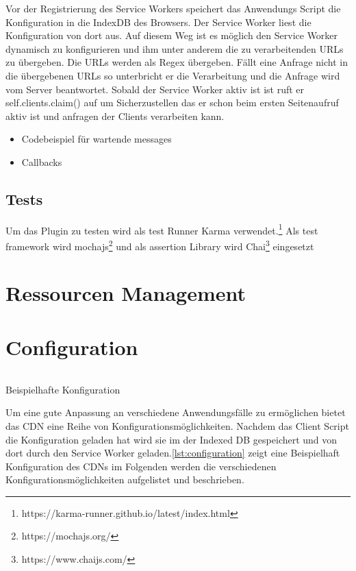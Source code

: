 Vor der Registrierung des Service Workers speichert das Anwendungs Script die Konfiguration in die IndexDB des Browsers. Der Service Worker liest die Konfiguration von dort aus. Auf diesem Weg ist es möglich den Service Worker dynamisch zu konfigurieren und ihm unter anderem die zu verarbeitenden URLs zu übergeben. Die URLs werden als Regex übergeben. Fällt eine Anfrage nicht in die übergebenen URLs so unterbricht er die Verarbeitung und die Anfrage wird vom Server beantwortet.
 Sobald der Service Worker aktiv ist ist ruft er self.clients.claim() auf um Sicherzustellen das er schon beim ersten Seitenaufruf aktiv ist und anfragen der Clients verarbeiten kann.
 
\begin{itemize}
  \item Codebeispiel für wartende messages
  \item 	Callbacks
  \end{itemize}

\subsection{Tests}
Um das Plugin zu testen wird als test Runner Karma verwendet.\footnote{https://karma-runner.github.io/latest/index.html} Als test framework wird mochajs\footnote{https://mochajs.org/} und als assertion Library wird Chai\footnote{https://www.chaijs.com/} eingesetzt 


\section{Ressourcen Management}



\section{Configuration}
\begin{listing}[h]
	\inputminted{javascript}{listings/configuration.js}
	\caption{Beispielhafte Konfiguration}
	\label{lst:configuration}
\end{listing}

Um eine gute Anpassung an verschiedene Anwendungsfälle zu ermöglichen bietet das \pTp CDN eine Reihe von Konfigurationsmöglichkeiten. Nachdem das Client Script die Konfiguration geladen hat wird sie im der Indexed DB gespeichert und von dort durch den Service Worker geladen.\ref{lst:configuration} zeigt eine Beispielhaft Konfiguration des CDNs im Folgenden werden die verschiedenen Konfigurationsmöglichkeiten aufgelistet und beschrieben.

